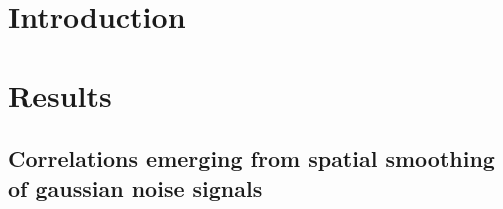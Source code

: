 \documentclass{article}
\begin{document}
\begin{multicols}{2}

\section*{Introduction}



\section*{Results}


\subsection*{Correlations emerging from spatial smoothing of gaussian noise signals}


\end{multicols}
\end{document}

